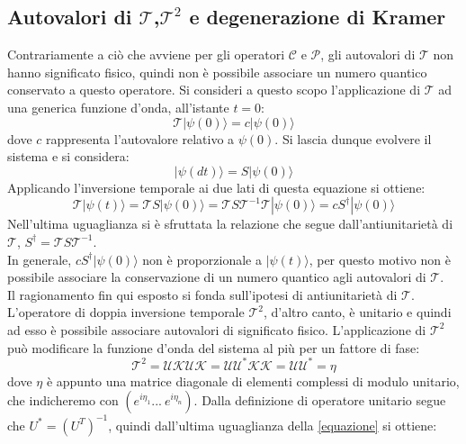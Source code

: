 \subsection{Autovalori di $\mathscr{T}$,$\mathscr{T}^2$ e degenerazione di Kramer}
\noindent
Contrariamente a ciò che avviene per gli operatori $\mathscr{C}$ e $\mathscr{P}$, gli autovalori di $\mathscr{T}$ non hanno significato fisico, quindi non \`e possibile associare un numero quantico conservato a questo operatore.
Si consideri a questo scopo l'applicazione di $\mathscr{T}$ ad una generica funzione d'onda, all'istante $t = 0$:
\begin {equation}
\mathscr{T}|\psi(0)\rangle = c|\psi(0)\rangle
\end {equation}
dove $c$ rappresenta l'autovalore relativo a $\psi(0)$. 
Si lascia dunque evolvere il sistema e si considera:
\begin{equation}
|\psi(dt)\rangle = S |\psi(0) \rangle
\end{equation}
Applicando l'inversione temporale ai due lati di questa equazione si ottiene:
\begin{equation}
\mathscr{T}|\psi(t)\rangle = \mathscr{T}S|\psi(0)\rangle =
\mathscr{T}S\mathscr{T}^{-1}\mathscr{T}|\psi(0)\rangle = cS^{\dag}|\psi(0)\rangle
\end{equation}
Nell'ultima uguaglianza si \`e sfruttata la relazione che segue dall'antiunitariet\`a di $\mathscr{T}$, 
$S^{\dag} = \mathscr{T} S {\mathscr{T}}^{-1}$.\\
In generale, $cS^{\dag}|\psi(0)\rangle$ non \`e proporzionale a $|\psi(t)\rangle$,
per questo motivo non \`e possibile associare la conservazione di un numero quantico agli autovalori di $\mathscr{T}$.\\
Il ragionamento fin qui esposto si fonda sull'ipotesi di antiunitariet\`a di $\mathscr{T}$.
L'operatore di doppia inversione temporale $\mathscr{T}^2$, d'altro canto, \`e unitario e quindi ad esso \`e possibile associare autovalori di significato fisico.
L'applicazione di $\mathscr{T}^2$ pu\`o modificare la funzione d'onda del sistema al pi\`u per un fattore di fase:
\begin{equation}\label{equazione}
\mathscr{T}^2 = \mathscr{U}\mathscr{K}\mathscr{U}\mathscr{K} =
\mathscr{U}\mathscr{U}^*\mathscr{K}\mathscr{K} =
\mathscr{U}\mathscr{U}^* = \eta
\end{equation}
dove $\eta$ \`e appunto una matrice diagonale di elementi complessi di modulo unitario, che indicheremo con $(e^{i\eta_1} ...\ e^{i\eta_n})$.
Dalla definizione di operatore unitario segue che $U^*=(U^T)^{-1}$, quindi dall'ultima uguaglianza della \eqref{equazione} si ottiene:
